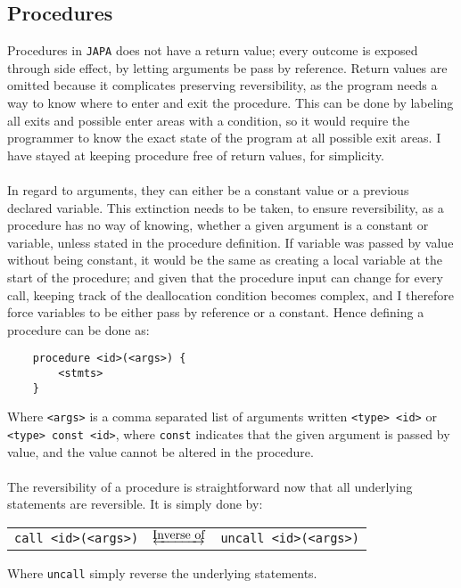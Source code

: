 \subsection{Procedures}
Procedures in \texttt{JAPA} does not have a return value; every outcome is exposed through side
effect, by letting arguments be pass by reference. Return values are omitted because it
complicates preserving reversibility, as the program needs a way to know where to enter and exit
the procedure. This can be done by labeling all exits and possible enter areas with a condition,
so it would require the programmer to know the exact state of the program at all possible exit areas.
I have stayed at keeping procedure free of return values, for simplicity.
\\
\\
In regard to arguments, they can either be a constant value or a previous declared variable. This
extinction needs to be taken, to ensure reversibility, as a procedure has no way of knowing, whether
a given argument is a constant or variable, unless stated in the procedure definition. If variable
was passed by value without being constant, it would be the same as creating a local variable at
the start of the procedure; and given that the procedure input can change for every call, keeping
track of the deallocation condition becomes complex, and I therefore force variables to be either
pass by reference or a constant. Hence defining a procedure can be done as:

\begin{lstlisting}
    procedure <id>(<args>) {
        <stmts>
    }
\end{lstlisting}
\noindent
Where \texttt{<args>} is a comma separated list of arguments written \texttt{<type> <id>} or
\texttt{<type> const <id>}, where \texttt{const} indicates that the given argument is passed by
value, and the value cannot be altered in the procedure.
\\
\\
The reversibility of a procedure is straightforward now that all underlying statements are
reversible. It is simply done by:

\begin{table*}[!h]
    \centering
    \begin{tabular}{lcl}
        \texttt{call <id>(<args>)} & $\underleftrightarrow{\text{Inverse of}}$ & \texttt{uncall <id>(<args>)}
    \end{tabular}
\end{table*}
\noindent
Where \texttt{uncall} simply reverse the underlying statements.

